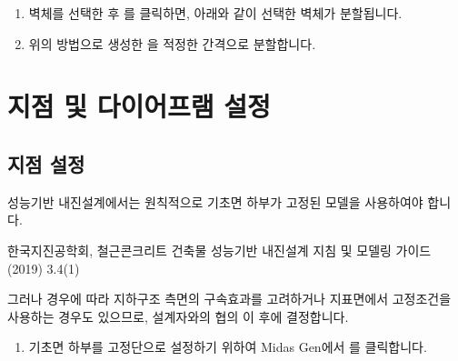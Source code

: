 \documentclass[a4paper,11pt,korean,openany,oneside]{sphinxmanual}
\begin{document}
\begin{sphinxShadowBox}
\begin{enumerate}
\newpage

\begin{center}
\noindent{}
\end{center}

\item {} 
\sphinxAtStartPar
벽체를 선택한 후 를 클릭하면, 아래와 같이 선택한 벽체가 분할됩니다.

\begin{center}
\noindent{}
\end{center}

\item {} 
\sphinxAtStartPar
위의 방법으로 생성한 을 적정한 간격으로 분할합니다.

\end{enumerate}
\end{sphinxShadowBox}

\sphinxstepscope


\section{지점 및 다이어프램 설정}
\label{\detokenize{1_support_setting:id1}}\label{\detokenize{1_support_setting::doc}}

\subsection{지점 설정}
\label{\detokenize{1_support_setting:id2}}
\sphinxAtStartPar
성능기반 내진설계에서는 원칙적으로 기초면 하부가 고정된 모델을 사용하여야 합니다. %
\begin{footnote}[1]\sphinxAtStartFootnote
한국지진공학회, 철근콘크리트 건축물 성능기반 내진설계 지침 및 모델링 가이드(2019) 3.4\sphinxhyphen{}(1)
%
\end{footnote}
그러나 경우에 따라 지하구조 측면의 구속효과를 고려하거나 지표면에서 고정조건을 사용하는 경우도 있으므로, 설계자와의 협의 이 후에 결정합니다.

\begin{sphinxShadowBox}
\begin{enumerate}
%
\item {} 
\sphinxAtStartPar
기초면 하부를 고정단으로 설정하기 위하여 Midas Gen에서  \sphinxhyphen{} 를 클릭합니다.

\end{enumerate}
\end{sphinxShadowBox}
\end{document}
